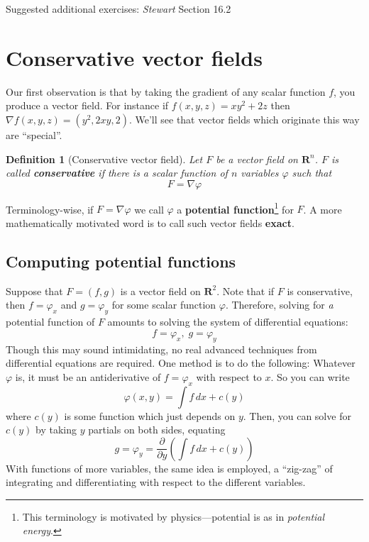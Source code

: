 \documentclass[12pt]{article}
\numberwithin{equation}{subsection}
\numberwithin{figure}{subsection}
\newtheorem{defn}[subsection]{Definition}
\theoremstyle{note}
\begin{document}
{Suggested additional exercises: \textit{Stewart} Section 16.2 

\section{Conservative vector fields}

Our first observation is that by taking the gradient of any scalar function $f$, you produce a vector field. For instance if $f(x,y,z)=xy^2+2z$ then $\nabla f(x,y,z)= (y^2, 2xy, 2)$. We'll see that vector fields which originate this way are ``special''.

\begin{defn}[Conservative vector field] Let $F$ be a vector field on $\mathbf{R}^n$. $F$ is called \textbf{conservative} if there is a scalar function of $n$ variables $\varphi$ such that \begin{equation} F=\nabla \varphi \end{equation}

\end{defn}
Terminology-wise, if $F=\nabla \varphi$ we call $\varphi$ a \textbf{potential function}\footnote{This terminology is motivated by physics---potential is as in \textit{potential energy}.} for $F$. A more mathematically motivated word is to call such vector fields \textbf{exact}.

\subsection{Computing potential functions} Suppose that $F=(f,g)$ is a vector field on $\mathbf{R}^2$. Note that if $F$ is conservative, then $f=\varphi_x$ and $g=\varphi_y$ for some scalar function $\varphi$. Therefore, solving for \textit{a} potential function of $F$ amounts to solving the system of differential equations: \begin{equation} f=\varphi_x, \;g=\varphi_y\end{equation} Though this may sound intimidating, no real advanced techniques from differential equations are required. One method is to do the following: Whatever $\varphi$ is, it must be an antiderivative of $f=\varphi_x$ with respect to $x$. So you can write \[ \varphi(x,y)= \int f \,dx+c(y)\] where $c(y)$ is some function which just depends on $y$. Then, you can solve for $c(y)$ by taking $y$ partials on both sides, equating \[ g=\varphi_y=\dfrac{\partial}{\partial y} \left( \int f\,dx + c(y)\right)\]
With functions of more variables, the same idea is employed, a ``zig-zag'' of integrating and differentiating with respect to the different variables. 

}
\end{document}
